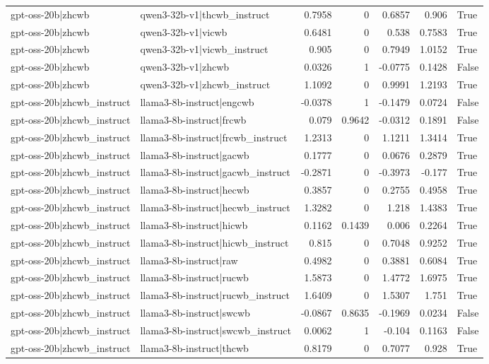 \begin{table}
\begin{tabular}{l l r r r r l}
gpt-oss-20b|zhcwb & qwen3-32b-v1|thcwb_instruct & 0.7958 & 0 & 0.6857 & 0.906 & True \\
gpt-oss-20b|zhcwb & qwen3-32b-v1|vicwb & 0.6481 & 0 & 0.538 & 0.7583 & True \\
gpt-oss-20b|zhcwb & qwen3-32b-v1|vicwb_instruct & 0.905 & 0 & 0.7949 & 1.0152 & True \\
gpt-oss-20b|zhcwb & qwen3-32b-v1|zhcwb & 0.0326 & 1 & -0.0775 & 0.1428 & False \\
gpt-oss-20b|zhcwb & qwen3-32b-v1|zhcwb_instruct & 1.1092 & 0 & 0.9991 & 1.2193 & True \\
gpt-oss-20b|zhcwb_instruct & llama3-8b-instruct|engcwb & -0.0378 & 1 & -0.1479 & 0.0724 & False \\
gpt-oss-20b|zhcwb_instruct & llama3-8b-instruct|frcwb & 0.079 & 0.9642 & -0.0312 & 0.1891 & False \\
gpt-oss-20b|zhcwb_instruct & llama3-8b-instruct|frcwb_instruct & 1.2313 & 0 & 1.1211 & 1.3414 & True \\
gpt-oss-20b|zhcwb_instruct & llama3-8b-instruct|gacwb & 0.1777 & 0 & 0.0676 & 0.2879 & True \\
gpt-oss-20b|zhcwb_instruct & llama3-8b-instruct|gacwb_instruct & -0.2871 & 0 & -0.3973 & -0.177 & True \\
gpt-oss-20b|zhcwb_instruct & llama3-8b-instruct|hecwb & 0.3857 & 0 & 0.2755 & 0.4958 & True \\
gpt-oss-20b|zhcwb_instruct & llama3-8b-instruct|hecwb_instruct & 1.3282 & 0 & 1.218 & 1.4383 & True \\
gpt-oss-20b|zhcwb_instruct & llama3-8b-instruct|hicwb & 0.1162 & 0.1439 & 0.006 & 0.2264 & True \\
gpt-oss-20b|zhcwb_instruct & llama3-8b-instruct|hicwb_instruct & 0.815 & 0 & 0.7048 & 0.9252 & True \\
gpt-oss-20b|zhcwb_instruct & llama3-8b-instruct|raw & 0.4982 & 0 & 0.3881 & 0.6084 & True \\
gpt-oss-20b|zhcwb_instruct & llama3-8b-instruct|rucwb & 1.5873 & 0 & 1.4772 & 1.6975 & True \\
gpt-oss-20b|zhcwb_instruct & llama3-8b-instruct|rucwb_instruct & 1.6409 & 0 & 1.5307 & 1.751 & True \\
gpt-oss-20b|zhcwb_instruct & llama3-8b-instruct|swcwb & -0.0867 & 0.8635 & -0.1969 & 0.0234 & False \\
gpt-oss-20b|zhcwb_instruct & llama3-8b-instruct|swcwb_instruct & 0.0062 & 1 & -0.104 & 0.1163 & False \\
gpt-oss-20b|zhcwb_instruct & llama3-8b-instruct|thcwb & 0.8179 & 0 & 0.7077 & 0.928 & True \\

\end{tabular}
\end{table}
